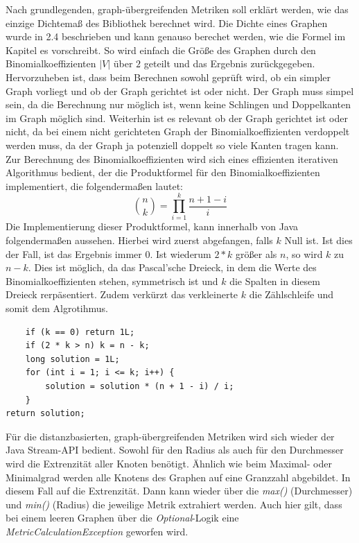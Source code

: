 \documentclass[a4paper,12pt,ngerman,chapterprefix=false,listof=totoc,bibliography=totoc]{scrreprt}
\begin{document}
{{{Nach grundlegenden, graph-übergreifenden Metriken soll erklärt werden, wie das einzige Dichtemaß des Bibliothek berechnet wird. Die Dichte eines Graphen wurde in 2.4 beschrieben und kann genauso berechet werden, wie die Formel im Kapitel es vorschreibt. So wird einfach die Größe des Graphen durch den Binomialkoeffizienten \(|V|\) über \(2\) geteilt und das Ergebnis zurückgegeben. Hervorzuheben ist, dass beim Berechnen sowohl geprüft wird, ob ein simpler Graph vorliegt und ob der Graph gerichtet ist oder nicht. Der Graph muss simpel sein, da die Berechnung nur möglich ist, wenn keine Schlingen und Doppelkanten im Graph möglich sind. Weiterhin ist es relevant ob der Graph gerichtet ist oder nicht, da bei einem nicht gerichteten Graph der Binomialkoeffizienten verdoppelt werden muss, da der Graph ja potenziell doppelt so viele Kanten tragen kann. Zur Berechnung des Binomialkoeffizienten wird sich eines effizienten iterativen Algorithmus bedient, der die Produktformel für den Binomialkoeffizienten implementiert, die folgendermaßen lautet:
\[
	\binom{n}{k}=\prod_{i=1}^{k}\frac{n+1-i}{i}
\]
Die Implementierung dieser Produktformel, kann innerhalb von Java folgendermaßen aussehen. Hierbei wird zuerst abgefangen, falls \(k\) Null ist. Ist dies der Fall, ist das Ergebnis immer 0. Ist wiederum \(2 * k\) größer als \(n\), so wird \(k\) zu \(n - k\). Dies ist möglich, da das Pascal'sche Dreieck, in dem die Werte des Binomialkoeffizienten stehen, symmetrisch ist und \(k\) die Spalten in diesem Dreieck rerpäsentiert. Zudem verkürzt das verkleinerte \(k\) die Zählschleife und somit dem Algrotihmus.
\begin{lstlisting}
	if (k == 0) return 1L;
	if (2 * k > n) k = n - k;
	long solution = 1L;
	for (int i = 1; i <= k; i++) {
		solution = solution * (n + 1 - i) / i;
	}
return solution;
\end{lstlisting}
Für die distanzbasierten, graph-übergreifenden Metriken wird sich wieder der Java Stream-API bedient. Sowohl für den Radius als auch für den Durchmesser wird die Extrenzität aller Knoten benötigt. Ähnlich wie beim Maximal- oder Minimalgrad werden alle Knotens des Graphen auf eine Granzzahl abgebildet. In diesem Fall auf die Extrenzität. Dann kann wieder über die \textit{max()} (Durchmesser) und \textit{min()} (Radius) die jeweilige Metrik extrahiert werden. Auch hier gilt, dass bei einem leeren Graphen über die \textit{Optional}-Logik eine \textit{MetricCalculationException} geworfen wird.

}}}
\end{document}
